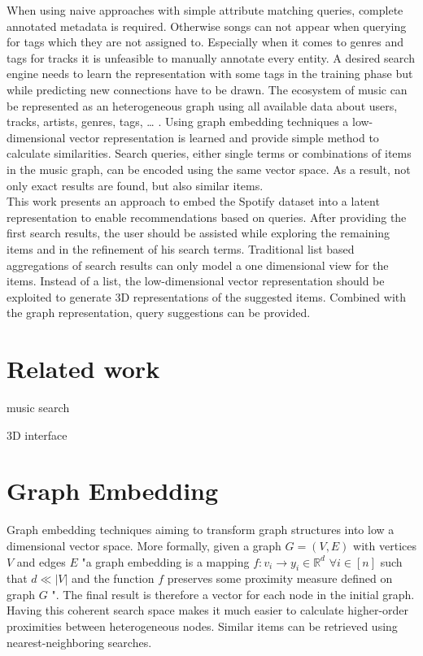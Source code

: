 \documentclass[a4paper]{llncs}
\begin{document}
	When using naive approaches with simple attribute matching queries, complete annotated metadata is required. Otherwise songs can not appear when querying for tags which they are not assigned to. Especially when it comes to genres and tags for tracks it is unfeasible to manually annotate every entity. A desired search engine needs to learn the representation with some tags in the training phase but while predicting new connections have to be drawn.
	The ecosystem of music can be represented as an heterogeneous graph using all available data about users, tracks, artists, genres, tags, … . Using graph embedding techniques a low-dimensional vector representation is learned and provide simple method to calculate similarities. Search queries, either single terms or combinations of items in the music graph, can be encoded using the same vector space. As a result, not only exact results are found, but also similar items. \\
	
	This work presents an approach to embed the Spotify dataset into a latent representation to enable recommendations based on queries. After providing the first search results, the user should be assisted while exploring the remaining items and in the refinement of his search terms. Traditional list based aggregations of search results can only model a one dimensional view for the items. Instead of a list, the low-dimensional vector representation should be exploited to generate 3D representations of the suggested items. Combined with the graph representation, query suggestions can be provided.

	
	
	\section{Related work}
	
	music search \cite{chen2016query}
	
	3D interface \cite{lamere2007using}
	
	
	\section{Graph Embedding}
	Graph embedding techniques aiming to transform graph structures into low a dimensional vector space. More formally, given a graph $ G = (V,E) $ with vertices $ V $ and edges $ E $ "a graph embedding is a mapping $ f : v_{i} \rightarrow y_{i} \in \mathbb{R}^{d} $ $ \forall i \in [n] $ such that $ d \ll |V| $ and the function $ f $ preserves some proximity measure defined on graph $ G $ "\cite{goyal2017graph}. The final result is therefore a vector for each node in the initial graph. Having this coherent search space makes it much easier to calculate higher-order proximities between heterogeneous nodes. Similar items can be retrieved using nearest-neighboring searches.
	
\end{document}
